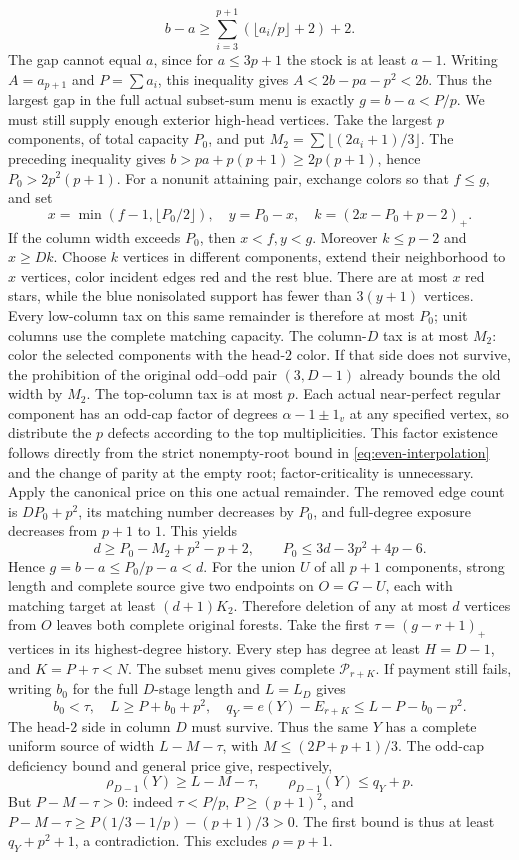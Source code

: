 \documentclass[11pt,a4paper]{article}
\newcommand{\p}{\mathcal P}
\theoremstyle{definition}
\begin{document}
\[
 b-a\ge \sum_{i=3}^{p+1}(\lfloor a_i/p\rfloor+2)+2.
\]
The gap cannot equal $a$, since for $a\le3p+1$ the stock is at least $a-1$. Writing $A=a_{p+1}$ and $P=\sum a_i$, this inequality gives $A<2b-pa-p^2<2b$. Thus the largest gap in the full actual subset-sum menu is exactly $g=b-a<P/p$.
We must still supply enough exterior high-head vertices. Take the largest $p$ components, of total capacity $P_0$, and put $M_2=\sum\lfloor(2a_i+1)/3\rfloor$. The preceding inequality gives $b>pa+p(p+1)\ge2p(p+1)$, hence $P_0>2p^2(p+1)$. For a nonunit attaining pair, exchange colors so that $f\le g$, and set
\[
 x=\min(f-1,\lfloor P_0/2\rfloor),\quad y=P_0-x,\quad
 k=(2x-P_0+p-2)_+.
\]
If the column width exceeds $P_0$, then $x<f,y<g$. Moreover $k\le p-2$ and $x\ge Dk$. Choose $k$ vertices in different components, extend their neighborhood to $x$ vertices, color incident edges red and the rest blue. There are at most $x$ red stars, while the blue nonisolated support has fewer than $3(y+1)$ vertices. Every low-column tax on this same remainder is therefore at most $P_0$; unit columns use the complete matching capacity. The column-$D$ tax is at most $M_2$: color the selected components with the head-$2$ color. If that side does not survive, the prohibition of the original odd--odd pair $(3,D-1)$ already bounds the old width by $M_2$. The top-column tax is at most $p$. Each actual near-perfect regular component has an odd-cap factor of degrees $\alpha-1\pm1_v$ at any specified vertex, so distribute the $p$ defects according to the top multiplicities. This factor existence follows directly from the strict nonempty-root bound in \eqref{eq:even-interpolation} and the change of parity at the empty root; factor-criticality is unnecessary.
Apply the canonical price on this one actual remainder. The removed edge count is $DP_0+p^2$, its matching number decreases by $P_0$, and full-degree exposure decreases from $p+1$ to $1$. This yields
\[
 d\ge P_0-M_2+p^2-p+2,\qquad P_0\le3d-3p^2+4p-6.
\]
Hence $g=b-a\le P_0/p-a<d$. For the union $U$ of all $p+1$ components, strong length and complete source give two endpoints on $O=G-U$, each with matching target at least $(d+1)K_2$. Therefore deletion of any at most $d$ vertices from $O$ leaves both complete original forests. Take the first $\tau=(g-r+1)_+$ vertices in its highest-degree history. Every step has degree at least $H=D-1$, and $K=P+\tau<N$. The subset menu gives complete $\p_{r+K}$. If payment still fails, writing $b_0$ for the full $D$-stage length and $L=L_D$ gives
\[
 b_0<\tau,\quad L\ge P+b_0+p^2,\quad
 q_Y=e(Y)-E_{r+K}\le L-P-b_0-p^2.
\]
The head-$2$ side in column $D$ must survive. Thus the same $Y$ has a complete uniform source of width $L-M-\tau$, with $M\le(2P+p+1)/3$. The odd-cap deficiency bound and general price give, respectively,
\[
 \rho_{D-1}(Y)\ge L-M-\tau,\qquad \rho_{D-1}(Y)\le q_Y+p.
\]
But $P-M-\tau>0$: indeed $\tau<P/p$, $P\ge(p+1)^2$, and
$P-M-\tau\ge P(1/3-1/p)-(p+1)/3>0$.
The first bound is thus at least $q_Y+p^2+1$, a contradiction. This excludes $\rho=p+1$.
\end{document}
